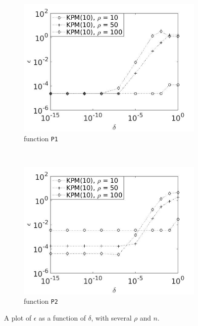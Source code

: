 \begin{figure}[H]
        \begin{subfigure}[b]{0.45\textwidth}
                \includegraphics[width=\textwidth]{fig/s15errvstol1m10}
                \caption{function \texttt{P1}}
                \label{fig:epsilondelta3}
        \end{subfigure}
~
        \begin{subfigure}[b]{0.45\textwidth}
                \includegraphics[width=\textwidth]{fig/s16errvstol2m10}
                \caption{ function \texttt{P2}}
                \label{fig:epsilondelta4}
        \end{subfigure}
        
        \caption{A plot of $\epsilon$ as a function of $\delta$, with several $\rho$ and $n$.} \label{fig:epsilondelta}
\end{figure}




